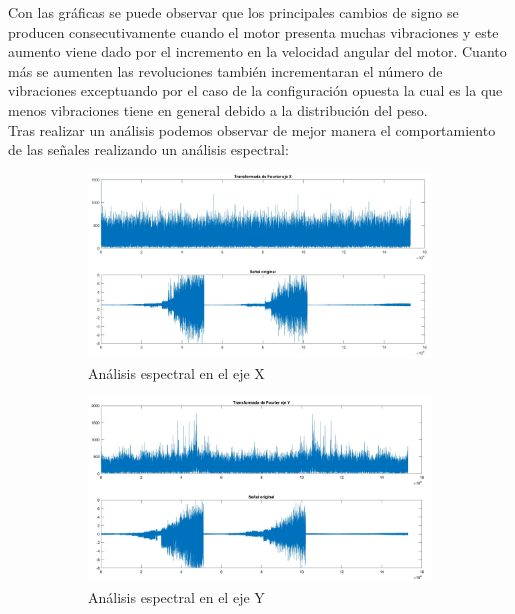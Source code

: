 \documentclass[11pt,a4paper]{article}
\begin{document}
Con las gráficas se puede observar que los principales cambios de signo se producen consecutivamente cuando el motor presenta muchas vibraciones y este aumento viene dado por el incremento en la velocidad angular del motor. Cuanto más se aumenten las revoluciones también incrementaran el número de vibraciones exceptuando por el caso de la configuración opuesta la cual es la que menos vibraciones tiene en general debido a la distribución del peso.
\\
Tras realizar un análisis podemos observar de mejor manera el comportamiento de las señales realizando un análisis espectral:
\begin{figure}[h!]
	\begin{subfigure}[b]{0.49\textwidth}
		\includegraphics[scale=0.20]{fft_x}
		\caption{Análisis espectral en el eje X}
		\label{fig:f1}
		\hfill
	\end{subfigure}
	\begin{subfigure}[b]{0.49\textwidth}
		\includegraphics[scale=0.20]{fft_y}
		\caption{Análisis espectral en el eje Y}
		\label{fig:f2}
		\hfill
	\end{subfigure}
	\begin{subfigure}[b]{1\textwidth}

\end{subfigure}
\end{figure}
\end{document}
